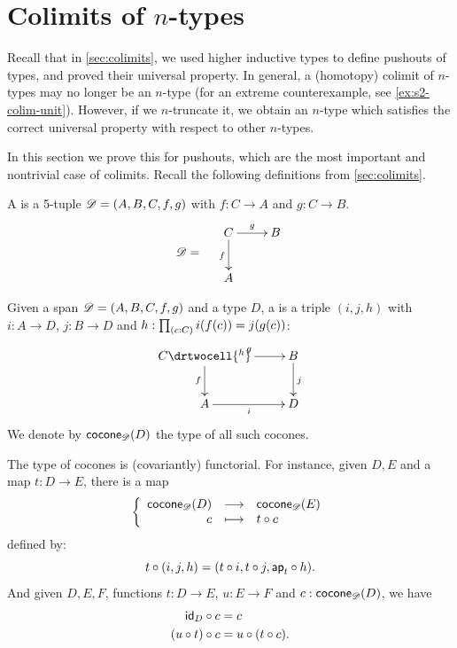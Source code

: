 %

\section{Colimits of \texorpdfstring{$n$}{n}-types}
\label{sec:pushouts}

Recall that in \cref{sec:colimits}, we used higher inductive types to define pushouts of types, and proved their universal property.
In general, a (homotopy) colimit of $n$-types may no longer be an $n$-type (for an extreme counterexample, see \cref{ex:s2-colim-unit}).
However, if we $n$-truncate it, we obtain an $n$-type which satisfies the correct universal property with respect to other $n$-types.

In this section we prove this for pushouts, which are the most important and nontrivial case of colimits.
Recall the following definitions from \cref{sec:colimits}.

\begin{defn}
  A  %
  is a 5-tuple $\Ddiag=(A,B,C,f,g)$ with %
  $f:C\to{}A$ and $g:C\to{}B$.
  \[\Ddiag=\quad\vcenter{\xymatrix{C \ar^g[r] \ar_f[d] & B \\ A & }}\]
\end{defn}

\begin{defn}
  Given a span $\Ddiag=(A,B,C,f,g)$ and a type $D$, a %
   is a triple $(i, j, h)$
  with $i:A\to{}D$, $j:B\to{}D$ and $h : \prd{c:C}i(f(c))=j(g(c))$:
  \[\uppercurveobject{{ }}\lowercurveobject{{ }}\twocellhead{{ }}
  \xymatrix{C \ar^g[r] \ar_f[d] \drtwocell{^h} & B \ar^j[d] \\ A \ar_i[r] & D
  }\]
  We denote by $\cocone{\Ddiag}{D}$ the type of all such cocones.
\end{defn}

The type of cocones is (covariantly) functorial.
For instance, given $D,E$ %
and a map $t:D\to{}E$, there is a map
  \[\function{\cocone{\Ddiag}{D}}{\cocone{\Ddiag}{E}}{c}{\composecocone{t}c}\]
  defined by:
  \[\composecocone{t}(i,j,h)=(t\circ{}i,t\circ{}j,\mapfunc{t}\circ{}h).\]
And given $D,E,F$, %
functions $t:D\to{}E$, $u:E\to{}F$ and $c:\cocone{\Ddiag}{D}$, we have
\begin{align}
  \composecocone{\idfunc[D]}c &= c \label{eq:composeconeid}\\
  \composecocone{(u\circ{}t)}c&=\composecocone{u}(\composecocone{t}c). \label{eq:composeconefunc}
\end{align}

